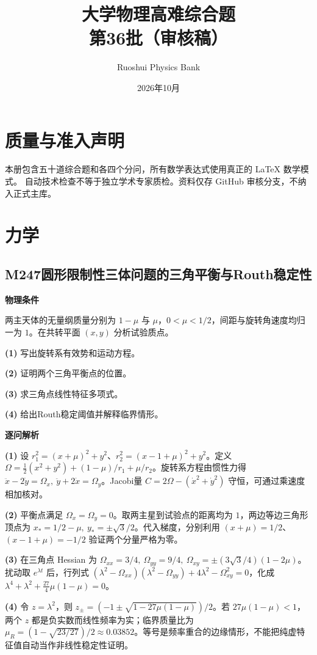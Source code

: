 \documentclass[UTF8,a4paper,11pt,oneside,openany]{ctexbook}
\begin{document}
\title{\textcolor{accent}{大学物理高难综合题}\\\Large 第36批（审核稿）}
\author{Ruoshui Physics Bank}
\date{2026年10月}
\maketitle
\tableofcontents
\chapter*{质量与准入声明}
本册包含五十道综合题和各四个分问，所有数学表达式使用真正的 \LaTeX{} 数学模式。
自动技术检查不等于独立学术专家质检。资料仅存 GitHub 审核分支，不纳入正式主库。

\chapter{力学}
\section*{M247\quad 圆形限制性三体问题的三角平衡与Routh稳定性}
\textbf{物理条件}\par 两主天体的无量纲质量分别为 \(1-\mu\) 与 \(\mu\)，\(0<\mu<1/2\)，间距与旋转角速度均归一为 \(1\)。在共转平面 \((x,y)\) 分析试验质点。
\par\noindent\textbf{(1)} 写出旋转系有效势和运动方程。
\par\noindent\textbf{(2)} 证明两个三角平衡点的位置。
\par\noindent\textbf{(3)} 求三角点线性特征多项式。
\par\noindent\textbf{(4)} 给出Routh稳定阈值并解释临界情形。

\par\medskip\noindent\textbf{逐问解析}
\par\noindent\textbf{(1)} 设 \(r_1^2=(x+\mu)^2+y^2\)、\(r_2^2=(x-1+\mu)^2+y^2\)。定义 \(\Omega=\tfrac12(x^2+y^2)+(1-\mu)/r_1+\mu/r_2\)。旋转系方程由惯性力得 \(\ddot x-2\dot y=\Omega_x,\ \ddot y+2\dot x=\Omega_y\)。Jacobi量 \(C=2\Omega-(\dot x^2+\dot y^2)\) 守恒，可通过乘速度相加核对。
\par\noindent\textbf{(2)} 平衡点满足 \(\Omega_x=\Omega_y=0\)。取两主星到试验点的距离均为 \(1\)，两边等边三角形顶点为 \(x_*=1/2-\mu,\ y_*=\pm\sqrt3/2\)。代入梯度，分别利用 \((x+\mu)=1/2\)、\((x-1+\mu)=-1/2\) 验证两个分量严格为零。
\par\noindent\textbf{(3)} 在三角点 Hessian 为 \(\Omega_{xx}=3/4,\ \Omega_{yy}=9/4,\ \Omega_{xy}=\pm (3\sqrt3/4)(1-2\mu)\)。扰动取 \(e^{\lambda t}\) 后，行列式 \((\lambda^2-\Omega_{xx})(\lambda^2-\Omega_{yy})+4\lambda^2-\Omega_{xy}^2=0\)，化成 \(\lambda^4+\lambda^2+\tfrac{27}{4}\mu(1-\mu)=0\)。
\par\noindent\textbf{(4)} 令 \(z=\lambda^2\)，则 \(z_{\pm}=(-1\pm\sqrt{1-27\mu(1-\mu)})/2\)。若 \(27\mu(1-\mu)<1\)，两个 \(z\) 都是负实数而线性频率为实；临界质量比为 \(\mu_R=(1-\sqrt{23/27})/2\approx0.03852\)。等号是频率重合的边缘情形，不能把纯虚特征值自动当作非线性稳定性证明。
\end{document}
